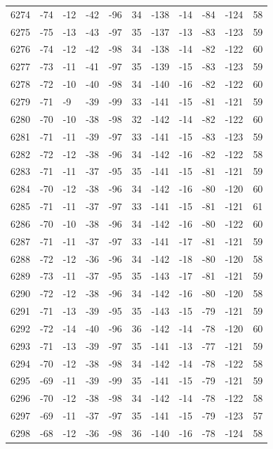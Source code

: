 \begin{table}[H]
\begin{tabular}{lllllllllll}
6274 & -74 & -12 & -42 & -96 & 34 & -138 & -14 & -84 & -124 & 58 \\
6275 & -75 & -13 & -43 & -97 & 35 & -137 & -13 & -83 & -123 & 59 \\
6276 & -74 & -12 & -42 & -98 & 34 & -138 & -14 & -82 & -122 & 60 \\
6277 & -73 & -11 & -41 & -97 & 35 & -139 & -15 & -83 & -123 & 59 \\
6278 & -72 & -10 & -40 & -98 & 34 & -140 & -16 & -82 & -122 & 60 \\
6279 & -71 & -9 & -39 & -99 & 33 & -141 & -15 & -81 & -121 & 59 \\
6280 & -70 & -10 & -38 & -98 & 32 & -142 & -14 & -82 & -122 & 60 \\
6281 & -71 & -11 & -39 & -97 & 33 & -141 & -15 & -83 & -123 & 59 \\
6282 & -72 & -12 & -38 & -96 & 34 & -142 & -16 & -82 & -122 & 58 \\
6283 & -71 & -11 & -37 & -95 & 35 & -141 & -15 & -81 & -121 & 59 \\
6284 & -70 & -12 & -38 & -96 & 34 & -142 & -16 & -80 & -120 & 60 \\
6285 & -71 & -11 & -37 & -97 & 33 & -141 & -15 & -81 & -121 & 61 \\
6286 & -70 & -10 & -38 & -96 & 34 & -142 & -16 & -80 & -122 & 60 \\
6287 & -71 & -11 & -37 & -97 & 33 & -141 & -17 & -81 & -121 & 59 \\
6288 & -72 & -12 & -36 & -96 & 34 & -142 & -18 & -80 & -120 & 58 \\
6289 & -73 & -11 & -37 & -95 & 35 & -143 & -17 & -81 & -121 & 59 \\
6290 & -72 & -12 & -38 & -96 & 34 & -142 & -16 & -80 & -120 & 58 \\
6291 & -71 & -13 & -39 & -95 & 35 & -143 & -15 & -79 & -121 & 59 \\
6292 & -72 & -14 & -40 & -96 & 36 & -142 & -14 & -78 & -120 & 60 \\
6293 & -71 & -13 & -39 & -97 & 35 & -141 & -13 & -77 & -121 & 59 \\
6294 & -70 & -12 & -38 & -98 & 34 & -142 & -14 & -78 & -122 & 58 \\
6295 & -69 & -11 & -39 & -99 & 35 & -141 & -15 & -79 & -121 & 59 \\
6296 & -70 & -12 & -38 & -98 & 34 & -142 & -14 & -78 & -122 & 58 \\
6297 & -69 & -11 & -37 & -97 & 35 & -141 & -15 & -79 & -123 & 57 \\
6298 & -68 & -12 & -36 & -98 & 36 & -140 & -16 & -78 & -124 & 58 \\

\end{tabular}
\end{table}
